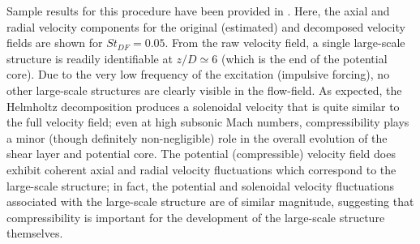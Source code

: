 Sample results for this procedure have been provided in .
Here, the axial and radial velocity components for the original (estimated) and decomposed velocity fields are shown for $St_{DF}=0.05$.
From the raw velocity field, a single large-scale structure is readily identifiable at $z/D \simeq 6$ (which is the end of the potential core).
Due to the very low frequency of the excitation (impulsive forcing), no other large-scale structures are clearly visible in the flow-field.
As expected, the Helmholtz decomposition produces a solenoidal velocity that is quite similar to the full velocity field; even at high subsonic Mach numbers, compressibility plays a minor (though definitely non-negligible) role in the overall evolution of the shear layer and potential core.
The potential (compressible) velocity field does exhibit coherent axial and radial velocity fluctuations which correspond to the large-scale structure; in fact, the potential and solenoidal velocity fluctuations associated with the large-scale structure are of similar magnitude, suggesting that compressibility is important for the development of the large-scale structure themselves.

